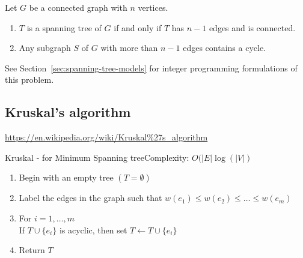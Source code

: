 \documentclass[../open-optimization/open-optimization.tex]{subfiles}
\begin{document}
\begin{lemma}
Let  $G$ be a  connected graph with $n$ vertices.  
\begin{enumerate}
\item $T$ is a spanning tree of $G$ if and only if $T$ has $n-1$ edges and is connected.
\item Any subgraph $S$ of $G$ with more than $n-1$ edges contains a cycle.
\end{enumerate}
\end{lemma}


See Section~\ref{sec:spanning-tree-models} for integer programming formulations of this problem.  
\subsection{Kruskal's algorithm}
\url{https://en.wikipedia.org/wiki/Kruskal\%27s_algorithm}
\begin{general}{Kruskal  - for Minimum Spanning tree}{Complexity: $O(|E| \log(|V|)$}
\label{alg:Kruskal}
\begin{enumerate}
\item Begin with an empty tree $(T = \emptyset)$
\item Label the edges in the graph such that $w(e_1) \leq w(e_2) \leq \dots \leq w(e_m)$
\item For $i=1, \dots, m$\\
\indent  If $T \cup\{e_i\}$ is acyclic, then set $T \leftarrow T \cup \{e_i\}$
\item Return $T$
\end{enumerate}
\end{general}


\end{document}
